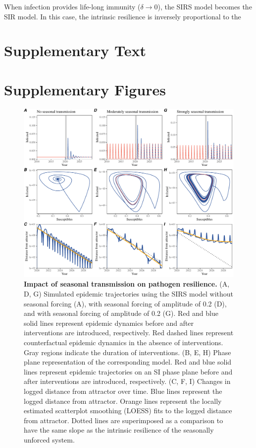 \documentclass[12pt]{article}
\begin{document}
When infection provides life-long immunity ($\delta \to 0$), the SIRS model becomes the SIR model.
In this case, the intrinsic resilience is inversely proportional to the 

\pagebreak

\section*{Supplementary Text}

\pagebreak

\setcounter{figure}{0}
\setcounter{equation}{0}
\renewcommand{\thefigure}{S\arabic{figure}}
\renewcommand{\theequation}{S\arabic{equation}}

\section*{Supplementary Figures}

\begin{figure}[!th]
\includegraphics[width=\textwidth]{../figure2/figure2_simple_seas.pdf}
\caption{
\textbf{Impact of seasonal transmission on pathogen resilience.}
(A, D, G) Simulated epidemic trajectories using the SIRS model without seasonal forcing (A), with seasonal forcing of amplitude of 0.2 (D), and with seasonal forcing of amplitude of 0.2 (G).
Red and blue solid lines represent epidemic dynamics before and after interventions are introduced, respectively.
Red dashed lines represent counterfactual epidemic dynamics in the absence of interventions.
Gray regions indicate the duration of interventions.
(B, E, H) Phase plane representation of the corresponding model.
Red and blue solid lines represent epidemic trajectories on an SI phase plane before and after interventions are introduced, respectively.
(C, F, I) Changes in logged distance from attractor over time.
Blue lines represent the logged distance from attractor.
Orange lines represent the locally estimated scatterplot smoothing (LOESS) fits to the logged distance from attractor.
Dotted lines are superimposed as a comparison to have the same slope as the intrinsic resilience of the seasonally unforced system.
}
\end{figure}
\end{document}
